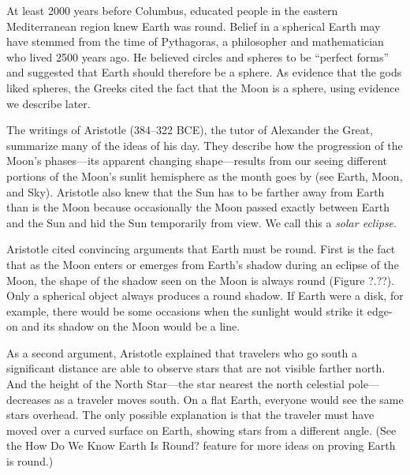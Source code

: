 \documentclass[main.tex]{subfiles}
\begin{document}
\vspace{1em}

At least 2000 years before Columbus, educated people in the eastern Mediterranean region knew Earth was round. Belief in a spherical Earth may have stemmed from the time of Pythagoras, a philosopher and mathematician who lived 2500 years ago. He believed circles and spheres to be ``perfect forms'' and suggested that Earth should therefore be a sphere. As evidence that the gods liked spheres, the Greeks cited the fact that the Moon is a sphere, using evidence we describe later.

\vspace{1em}

The writings of Aristotle (384--322 BCE), the tutor of Alexander the Great, summarize many of the ideas of his day. They describe how the progression of the Moon's phases---its apparent changing shape---results from our seeing different portions of the Moon's sunlit hemisphere as the month goes by (see Earth, Moon, and Sky). Aristotle also knew that the Sun has to be farther away from Earth than is the Moon because occasionally the Moon passed exactly between Earth and the Sun and hid the Sun temporarily from view. We call this a \textit{solar eclipse}.

\vspace{1em}

Aristotle cited convincing arguments that Earth must be round. First is the fact that as the Moon enters or emerges from Earth's shadow during an eclipse of the Moon, the shape of the shadow seen on the Moon is always round (Figure ?.??). Only a spherical object always produces a round shadow. If Earth were a disk, for example, there would be some occasions when the sunlight would strike it edge-on and its shadow on the Moon would be a line.


\vspace{1em}

As a second argument, Aristotle explained that travelers who go south a significant distance are able to observe stars that are not visible farther north. And the height of the North Star---the star nearest the north celestial pole---decreases as a traveler moves south. On a flat Earth, everyone would see the same stars overhead. The only possible explanation is that the traveler must have moved over a curved surface on Earth, showing stars from a different angle. (See the How Do We Know Earth Is Round? feature for more ideas on proving Earth is round.)
\end{document}
